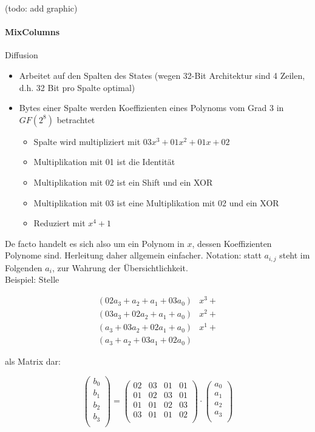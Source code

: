 (todo: add graphic)

\paragraph{MixColumns}

Diffusion
\begin{itemize}
    \item Arbeitet auf den Spalten des States (wegen 32-Bit Architektur sind 4 Zeilen, d.h. 32 Bit pro Spalte optimal)
    \item Bytes einer Spalte werden Koeffizienten eines Polynoms vom Grad 3 in $GF(2^8)$ betrachtet
    \begin{itemize}
        \item Spalte wird multipliziert mit $03x^3 + 01x^2 + 01x + 02$
        \item Multiplikation mit 01 ist die Identität 
        \item Multiplikation mit 02 ist ein Shift und ein XOR 
        \item Multiplikation mit 03 ist eine Multiplikation mit 02 und ein XOR 
        \item Reduziert mit $x^4 + 1$ 
    \end{itemize}
\end{itemize}

De facto handelt es sich also um ein Polynom in $x$, dessen Koeffizienten Polynome sind. Herleitung daher allgemein einfacher.
Notation: statt $a_{i,j}$ steht im Folgenden $a_i$, zur Wahrung der Übersichtlichkeit. \\

Beispiel: Stelle 

\begin{align*}
    (02a_3+a_2+a_1+03a_0)&x^3 + \\
    (03a_3+02a_2+a_1+a_0)&x^2 + \\
    (a_3+03a_2+02a_1+a_0)&x^1 + \\ 
    (a_3+a_2+03a_1+02a_0)& 
\end{align*}
    
    als Matrix dar:

\begin{equation*}
    \begin{pmatrix}
        b_0 \\ b_1 \\ b_2 \\ b_3 \\
\end{pmatrix}  = \begin{pmatrix}
        02 & 03 & 01 & 01 \\
        01 & 02 & 03 & 01 \\
        01 & 01 & 02 & 03 \\
        03 & 01 & 01 & 02 \\
\end{pmatrix} \cdot \begin{pmatrix}
        a_0 \\ a_1 \\ a_2 \\ a_3 \\
\end{pmatrix} 
\end{equation*}

